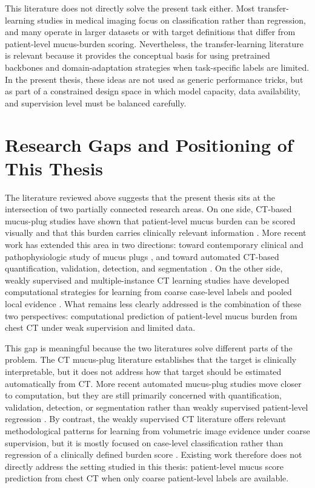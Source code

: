 This literature does not directly solve the present task either. Most transfer-learning studies in medical imaging focus on classification rather than regression, and many operate in larger datasets or with target definitions that differ from patient-level mucus-burden scoring. Nevertheless, the transfer-learning literature is relevant because it provides the conceptual basis for using pretrained backbones and domain-adaptation strategies when task-specific labels are limited. In the present thesis, these ideas are not used as generic performance tricks, but as part of a constrained design space in which model capacity, data availability, and supervision level must be balanced carefully.


\section{Research Gaps and Positioning of This Thesis}

The literature reviewed above suggests that the present thesis sits at the intersection of two partially connected research areas. On one side, CT-based mucus-plug studies have shown that patient-level mucus burden can be scored visually and that this burden carries clinically relevant information \cite{dunican2018mucus,dunican2018autopsy}. More recent work has extended this area in two directions: toward contemporary clinical and pathophysiologic study of mucus plugs \cite{hsieh2025smallairwaymucus}, and toward automated CT-based quantification, validation, detection, and segmentation \cite{vanderveer2025aicopdmucus,raut2025pragmaai,pu2026simulation}. On the other side, weakly supervised and multiple-instance CT learning studies have developed computational strategies for learning from coarse case-level labels and pooled local evidence \cite{qi2021drmil,xue2023copdmil,almakky2025weakly}. What remains less clearly addressed is the combination of these two perspectives: computational prediction of patient-level mucus burden from chest CT under weak supervision and limited data.

This gap is meaningful because the two literatures solve different parts of the problem. The CT mucus-plug literature establishes that the target is clinically interpretable, but it does not address how that target should be estimated automatically from CT. More recent automated mucus-plug studies move closer to computation, but they are still primarily concerned with quantification, validation, detection, or segmentation rather than weakly supervised patient-level regression \cite{vanderveer2025aicopdmucus,raut2025pragmaai,pu2026simulation}. By contrast, the weakly supervised CT literature offers relevant methodological patterns for learning from volumetric image evidence under coarse supervision, but it is mostly focused on case-level classification rather than regression of a clinically defined burden score \cite{qi2021drmil,xue2023copdmil,almakky2025weakly}. Existing work therefore does not directly address the setting studied in this thesis: patient-level mucus score prediction from chest CT when only coarse patient-level labels are available.

